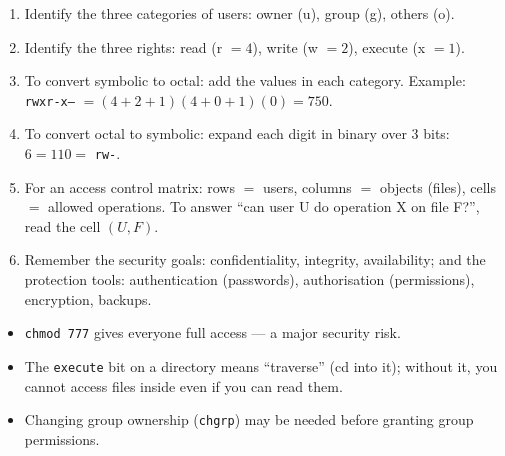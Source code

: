 \documentclass[11pt]{article}
\newcommand{\cle}[1]{{\popxbold\color{popdark}#1}}
\begin{document}
\begin{methode}
\begin{enumerate}
\item Identify the three categories of users: \cle{owner} (u), \cle{group} (g), \cle{others} (o).
\item Identify the three rights: \cle{read} (r $=4$), \cle{write} (w $=2$), \cle{execute} (x $=1$).
\item To convert symbolic to octal: add the values in each category. Example: \texttt{rwxr-x---} $= (4{+}2{+}1)(4{+}0{+}1)(0) = 750$.
\item To convert octal to symbolic: expand each digit in binary over 3 bits: $6 = 110 =$ \texttt{rw-}.
\item For an \cle{access control matrix}: rows $=$ users, columns $=$ objects (files), cells $=$ allowed operations. To answer ``can user U do operation X on file F?'', read the cell $(U, F)$.
\item Remember the security goals: \cle{confidentiality}, \cle{integrity}, \cle{availability}; and the protection tools: authentication (passwords), authorisation (permissions), encryption, backups.
\end{enumerate}
\end{methode}

\begin{attention}
\begin{itemize}
\item \texttt{chmod 777} gives everyone full access — a major security risk.
\item The \texttt{execute} bit on a directory means ``traverse'' (cd into it); without it, you cannot access files inside even if you can read them.
\item Changing group ownership (\texttt{chgrp}) may be needed before granting group permissions.
\end{itemize}
\end{attention}
\end{document}
